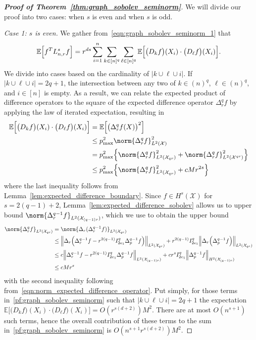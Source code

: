 \documentclass{article}
\newcommand{\abs}[1]{\left \lvert #1 \right \rvert}
\newcommand{\1}{\mathbf{1}}
\newcommand{\Lap}{L}
\newcommand{\Xset}{\mathcal{X}}
\newcommand{\Leb}{L}
\newcommand{\Ebb}{\mathbb{E}}
\theoremstyle{alden}
\theoremstyle{aldenthm}
\theoremstyle{definition}
\theoremstyle{remark}
\begin{document}
\begin{proof}[\textbf{Proof of Theorem~\ref{thm:graph_sobolev_seminorm}}]
	We will divide our proof into two cases: when $s$ is even and when $s$ is odd. 
	
	\textit{Case 1: $s$ is even.} We gather from~\eqref{eqn:graph_sobolev_seminorm_1} that 
	\begin{equation}
	\label{pf:graph_sobolev_seminorm}
	\Ebb\Bigl[f^T \Lap_{n,r}^s f\Bigr] = r^{ds}\sum_{i = 1}^{n} \sum_{k \in [n]^q} \sum_{\ell \in [n]^q} \Ebb\Bigl[\bigl(D_kf\bigr)(X_i) \cdot  \bigl(D_{\ell}f\bigr)(X_i)\Bigr].
	\end{equation}
	We divide into cases based on the cardinality of $\abs{k \cup \ell \cup i}$. If $\abs{k \cup \ell \cup i} = 2q + 1$, the intersection between any two of $k \in (n)^q$, $\ell \in (n)^q$, and $i \in [n]$ is empty. As a result, we can relate the expected product of difference operators to the square of the expected difference operator $\Delta_r^qf$ by applying the law of iterated expectation, resulting in
	\begin{align*}
	\Ebb\Bigl[\bigl(D_kf\bigr)(X_i) \cdot \bigl(D_{\ell}f\bigr)(X_i)\Bigr] & = \Ebb\Bigl[\bigl(\Delta_r^qf(X)\bigr)^2\Bigr] \\
	& \leq p_{\max}^2 \norm{\Delta_r^qf}_{\Leb^2(\Xset)}^2 \\
	& = p_{\max}^2 \Bigl\{\norm{\Delta_r^qf}_{\Leb^2(\Xset_{qr})}^2 + \norm{\Delta_r^qf}_{\Leb^2(\Xset^{qr})}^2\Bigr\} \\
	& \leq p_{\max}^2 \Bigl\{\norm{\Delta_r^qf}_{\Leb^2(\Xset_{qr})}^2 + c M r^{2s}\Bigr\} 
	\end{align*}
	where the last inequality follows from Lemma~\ref{lem:expected_difference_boundary}. Since $f \in H^{s}(\Xset)$ for $s = 2(q - 1) + 2$, Lemma~\ref{lem:expected_difference_sobolev} allows us to upper bound $\norm{\Delta_r^{q - 1}f}_{\Leb^2(\Xset_{(q - 1)r})}$, which we use to obtain the upper bound
	\begin{align}
	\norm{\Delta_r^qf}_{\Leb^2(\Xset_{qr})} & = \norm{\Delta_r(\Delta_r^{q - 1}f)}_{\Leb^2(\Xset_{qr})} \nonumber \\
	& \leq \Bigl\|\Delta_r\Bigl(\Delta_r^{q - 1}f - r^{2(q - 1)}I_{2e_1}^q\Delta_p^{q - 1}f\Bigr)\Bigr\|_{\Leb^2(\Xset_{qr})} +  r^{2(q - 1)}I_{2e_1}^q\Bigl\|\Delta_r\Bigl(\Delta_p^{q - 1}f\Bigr)\Bigr\|_{\Leb^2(\Xset_{qr})} \nonumber \\ 
	& \leq c \Bigl\|\Delta_r^{q - 1}f - r^{2(q - 1)}I_{2e_1}^q\Delta_p^{q - 1}f\Bigr\|_{\Leb^2(\Xset_{(q - 1)r})} +  c r^{s}I_{2e_1}^q\Bigl\|\Delta_p^{q - 1}f\Bigr\|_{H^2(\Xset_{(q - 1)r})} \nonumber \\
	& \leq c M r^s
	\end{align}
	with the second inequality following from~\eqref{eqn:norm_expected_difference_operator}. Put simply, for those terms in~\eqref{pf:graph_sobolev_seminorm} such that $\abs{k \cup \ell \cup i} = 2q + 1$ the expectation $\Ebb\bigl[\bigl(D_kf\bigr)(X_i) \cdot \bigl(D_{\ell}f\bigr)(X_i)\bigr] = O(r^{s(d + 2)})M^2$. There are at most $O(n^{s + 1})$ such terms, hence the overall contribution of these terms to the sum in~\eqref{pf:graph_sobolev_seminorm} is $O(n^{s + 1}r^{s(d + 2)})M^2$. 
	

\end{proof}
\end{document}
